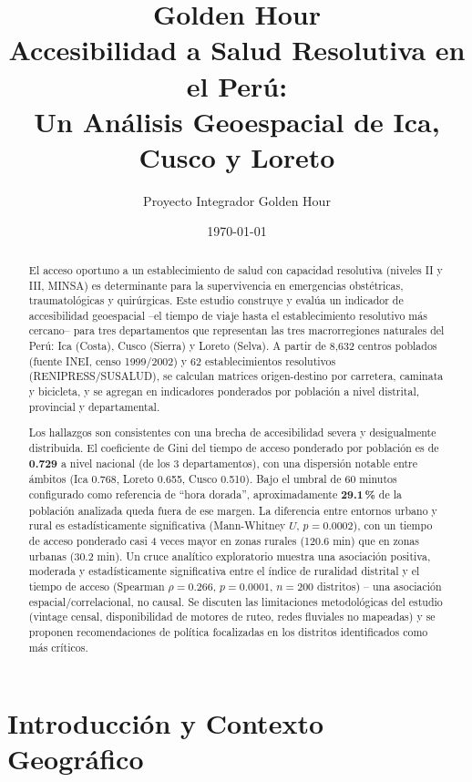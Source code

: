 \documentclass[11pt]{article}
\title{\textbf{Golden Hour}\\[4pt]
  \large Accesibilidad a Salud Resolutiva en el Perú:\\
  Un Análisis Geoespacial de Ica, Cusco y Loreto}
\author{Proyecto Integrador Golden Hour}
\date{\today}
\begin{document}
\maketitle

\renewcommand{\abstractname}{Resumen Ejecutivo}
\begin{abstract}
\noindent
El acceso oportuno a un establecimiento de salud con capacidad resolutiva
(niveles II y III, MINSA) es determinante para la supervivencia en
emergencias obstétricas, traumatológicas y quirúrgicas. Este estudio
construye y evalúa un indicador de accesibilidad geoespacial --el
tiempo de viaje hasta el establecimiento resolutivo más cercano-- para
tres departamentos que representan las tres macrorregiones naturales del
Perú: Ica (Costa), Cusco (Sierra) y Loreto (Selva). A partir de 8{,}632
centros poblados (fuente INEI, censo 1999/2002) y 62 establecimientos
resolutivos (RENIPRESS/SUSALUD), se calculan matrices origen-destino por
carretera, caminata y bicicleta, y se agregan en indicadores ponderados
por población a nivel distrital, provincial y departamental.

Los hallazgos son consistentes con una brecha de accesibilidad severa y
desigualmente distribuida. El coeficiente de Gini del tiempo de acceso
ponderado por población es de \textbf{0.729} a nivel nacional (de los 3
departamentos), con una dispersión notable entre ámbitos (Ica 0.768,
Loreto 0.655, Cusco 0.510). Bajo el umbral de 60 minutos configurado como
referencia de ``hora dorada'', aproximadamente \textbf{29.1\,\%} de la
población analizada queda fuera de ese margen. La diferencia entre
entornos urbano y rural es estadísticamente significativa (Mann-Whitney
$U$, $p = 0.0002$), con un tiempo de acceso ponderado casi 4 veces mayor
en zonas rurales (120.6 min) que en zonas urbanas (30.2 min). Un cruce
analítico exploratorio muestra una asociación positiva, moderada y
estadísticamente significativa entre el índice de ruralidad distrital y
el tiempo de acceso (Spearman $\rho = 0.266$, $p = 0.0001$, $n = 200$
distritos) -- una asociación espacial/correlacional, no causal. Se
discuten las limitaciones metodológicas del estudio (vintage censal,
disponibilidad de motores de ruteo, redes fluviales no mapeadas) y se
proponen recomendaciones de política focalizadas en los distritos
identificados como más críticos.
\end{abstract}

\tableofcontents

\section{Introducción y Contexto Geográfico}
\end{document}
